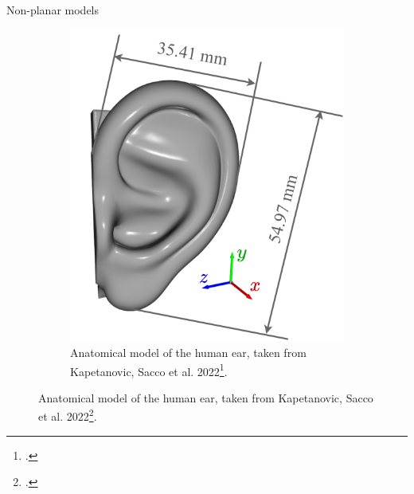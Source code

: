\documentclass[xcolor=dvipsnames,10pt]{beamer}
\begin{document}
\begin{frame}{Non-planar models}
\begin{figure}
\begin{subfigure}[b]{0.3\textwidth}
         \includegraphics[width=\textwidth]{figures/Kapetanovic2022Figure1.png}
         \caption{Anatomical model of the human ear, taken from Kapetanovic, Sacco et al. 2022\footcite{Kapetanovic2022AssessmentJERM}.}
     \end{subfigure}
    \end{figure}
\end{frame}
\end{document}
